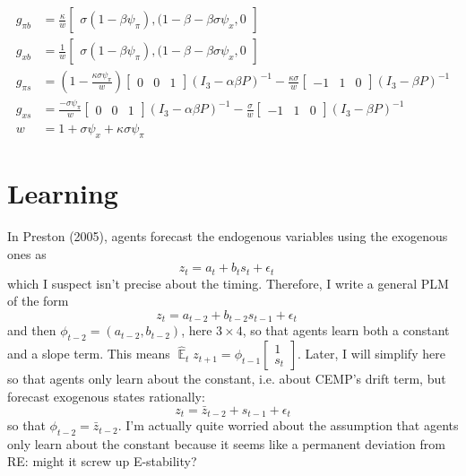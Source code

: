 \documentclass[11pt]{article}
\renewcommand{\[}{\begin{equation}}
\renewcommand{\]}{\end{equation}}
\DeclareMathOperator{\E}{\mathbb{E}}
\begin{document}
\begin{align}
g_{\pi b} & = \frac{\kappa}{w} \begin{bmatrix}\sigma(1-\beta\psi_{\pi}), (1-\beta-\beta\sigma\psi_x, 0 \end{bmatrix}\\
g_{x b} & = \frac{1}{w} \begin{bmatrix}\sigma(1-\beta\psi_{\pi}), (1-\beta-\beta\sigma\psi_x, 0 \end{bmatrix} \\
g_{\pi s} & = (1-\frac{\kappa\sigma\psi_{\pi}}{w} )\begin{bmatrix} 0&0&1 \end{bmatrix} (I_3 - \alpha\beta P)^{-1} -\frac{\kappa\sigma}{w}\begin{bmatrix} -1&1&0 \end{bmatrix} (I_3 -\beta P)^{-1}\\
g_{x s} & =  \frac{-\sigma\psi_{\pi}}{w} \begin{bmatrix} 0&0&1 \end{bmatrix}(I_3 - \alpha\beta P)^{-1}  -\frac{\sigma}{w}\begin{bmatrix} -1&1&0 \end{bmatrix}(I_3 -\beta P)^{-1}\\
w & = 1+\sigma\psi_x +\kappa\sigma\psi_{\pi}
\end{align}
\clearpage

 \section{Learning}

In Preston (2005), agents forecast the endogenous variables using the exogenous ones as
\begin{equation}
z_t = a_{t} + b_{t} s_{t} + \epsilon_t \quad  \tag{Preston, p. 101}
\end{equation}
which I suspect isn't precise about the timing. Therefore, I write a general PLM of the form
\begin{equation}
z_t = a_{t-2} + b_{t-2} s_{t-1} + \epsilon_t \quad  \label{generalPLM}
\end{equation}
and then $\phi_{t-2} = (a_{t-2}, b_{t-2})$, here $3\times4$, so that agents learn both a constant and a slope term. This means $\hat{\E}_t z_{t+1} = \phi_{t-1}\begin{bmatrix} 1 \\ s_{t} \end{bmatrix} $. Later, I will simplify here so that agents only learn about the constant, i.e. about CEMP's drift term, but forecast exogenous states rationally:
\begin{equation}
z_t = \bar{z}_{t-2} + s_{t-1} + \epsilon_t \label{PLM}  
\end{equation}
so that $\phi_{t-2} = \bar{z}_{t-2}$. I'm actually quite worried about the assumption that agents only learn about the constant because it seems like a permanent deviation from RE: might it screw up E-stability? 
\end{document}
